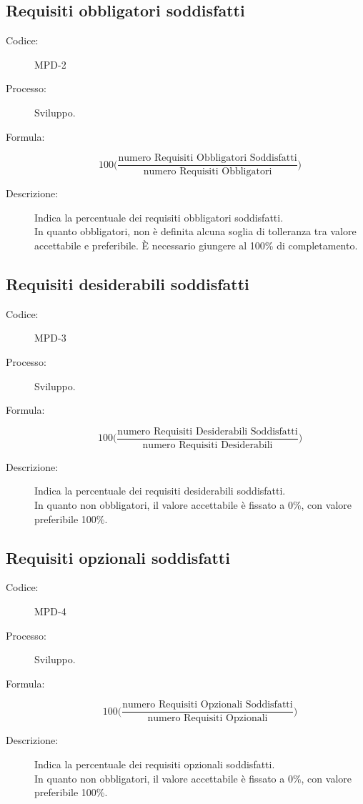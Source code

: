 \subsection{Requisiti obbligatori soddisfatti}
\begin{description}
    \item[Codice:] MPD-2
    \item[Processo:] Sviluppo.
    \item[Formula:]
    \begin{equation}
        100\biggl(\frac{\text{numero Requisiti Obbligatori Soddisfatti}}{\text{numero Requisiti Obbligatori}}\biggr)
    \end{equation}
    \item[Descrizione:] Indica la percentuale dei requisiti obbligatori soddisfatti.\\ In quanto obbligatori, non è definita alcuna soglia di tolleranza tra valore accettabile e preferibile. È necessario giungere al 100\% di completamento.
\end{description}

\subsection{Requisiti desiderabili soddisfatti}
\begin{description}
    \item[Codice:] MPD-3
    \item[Processo:] Sviluppo.
    \item[Formula:]
    \begin{equation}
        100\biggl(\frac{\text{numero Requisiti Desiderabili Soddisfatti}}{\text{numero Requisiti Desiderabili}}\biggr)
    \end{equation}
    \item[Descrizione:] Indica la percentuale dei requisiti desiderabili soddisfatti.\\ In quanto non obbligatori, il valore accettabile è fissato a 0\%, con valore preferibile 100\%.
\end{description}

\subsection{Requisiti opzionali soddisfatti}
\begin{description}
    \item[Codice:] MPD-4
    \item[Processo:] Sviluppo.
    \item[Formula:]
    \begin{equation}
        100\biggl(\frac{\text{numero Requisiti Opzionali Soddisfatti}}{\text{numero Requisiti Opzionali}}\biggr)
    \end{equation}
    \item[Descrizione:] Indica la percentuale dei requisiti opzionali soddisfatti.\\ In quanto non obbligatori, il valore accettabile è fissato a 0\%, con valore preferibile 100\%.
\end{description}
\newpage
